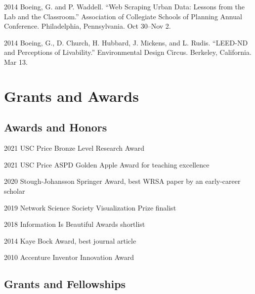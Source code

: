 \documentclass[12pt,letterpaper]{report}
\begin{document}
\begin{tablist}
        \item[2014] \tab{}Boeing, G. and P. Waddell. \enquote{Web Scraping Urban Data: Lessons from the Lab and the Classroom.} Association of Collegiate Schools of Planning Annual Conference. Philadelphia, Pennsylvania. Oct 30--Nov 2.

        \item[2014] \tab{}Boeing, G., D. Church, H. Hubbard, J. Mickens, and L. Rudis. \enquote{LEED-ND and Perceptions of Livability.} Environmental Design Circus. Berkeley, California. Mar 13.

    \end{tablist}



    \section*{Grants and Awards}

    \subsection*{Awards and Honors}

    \begin{tablist}

        \item[2021] \tab{}USC Price Bronze Level Research Award
        \item[2021] \tab{}USC Price ASPD Golden Apple Award for teaching excellence
        \item[2020] \tab{}Stough-Johansson Springer Award, best WRSA paper by an early-career scholar
        \item[2019] \tab{}Network Science Society Visualization Prize finalist
        \item[2018] \tab{}Information Is Beautiful Awards shortlist
        \item[2014] \tab{}Kaye Bock Award, best journal article
        \item[2010] \tab{}Accenture Inventor Innovation Award

    \end{tablist}

    \subsection*{Grants and Fellowships}
\end{document}
